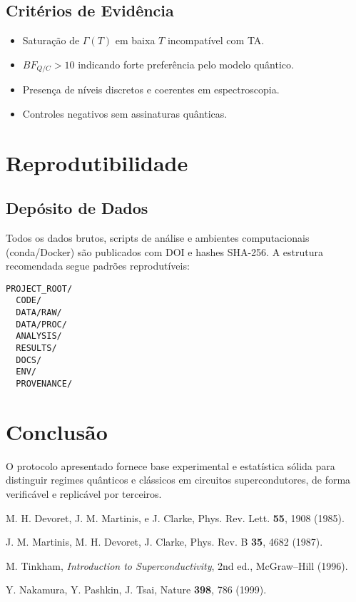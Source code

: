 \documentclass[aps,prb,reprint,showpacs,superscriptaddress,longbibliography]{revtex4-2}
\begin{document}
\subsection{Critérios de Evidência}
\begin{itemize}
\item Saturação de $\Gamma(T)$ em baixa $T$ incompatível com TA.
\item $BF_{Q/C} > 10$ indicando forte preferência pelo modelo quântico.
\item Presença de níveis discretos e coerentes em espectroscopia.
\item Controles negativos sem assinaturas quânticas.
\end{itemize}

\section{Reprodutibilidade}

\subsection{Depósito de Dados}
Todos os dados brutos, scripts de análise e ambientes computacionais (conda/Docker) são publicados com DOI e hashes SHA-256. A estrutura recomendada segue padrões reprodutíveis:

\begin{verbatim}
PROJECT_ROOT/
  CODE/
  DATA/RAW/
  DATA/PROC/
  ANALYSIS/
  RESULTS/
  DOCS/
  ENV/
  PROVENANCE/
\end{verbatim}

\section{Conclusão}

O protocolo apresentado fornece base experimental e estatística sólida para distinguir regimes quânticos e clássicos em circuitos supercondutores, de forma verificável e replicável por terceiros.


\begin{thebibliography}{99}

 M. H. Devoret, J. M. Martinis, e J. Clarke, Phys. Rev. Lett. \textbf{55}, 1908 (1985).

 J. M. Martinis, M. H. Devoret, J. Clarke, Phys. Rev. B \textbf{35}, 4682 (1987).

 M. Tinkham, \textit{Introduction to Superconductivity}, 2nd ed., McGraw–Hill (1996).

 Y. Nakamura, Y. Pashkin, J. Tsai, Nature \textbf{398}, 786 (1999).

\end{thebibliography}
\end{document}
